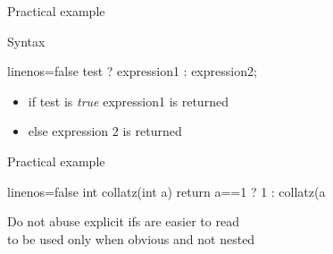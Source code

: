 \begin{frame}[fragile]
  \begin{exampleblock}{Practical example}
  \end{exampleblock}
\end{frame}

\begin{frame}[fragile]
  \begin{block}{Syntax}
    \begin{cppcode*}{linenos=false}
      test ? expression1 : expression2;
    \end{cppcode*}
    \vspace{-0.3cm}
    \begin{itemize}
      \item if test is {\it true} expression1 is returned
      \item else expression 2 is returned
    \end{itemize}
  \end{block}
  \pause
  \begin{exampleblock}{Practical example}
    \begin{cppcode*}{linenos=false}
      int collatz(int a) {
        return a==1 ? 1 : collatz(a%
      }
    \end{cppcode*}
  \end{exampleblock}
  \pause
  \begin{alertblock}{Do not abuse}
    explicit ifs are easier to read \\
    to be used only when obvious and not nested
  \end{alertblock}
\end{frame}

